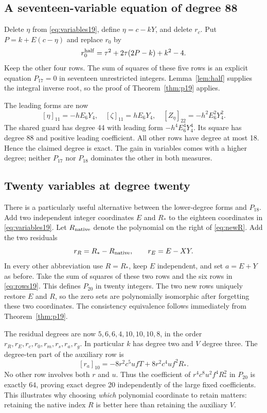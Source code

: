 \documentclass[11pt]{article}
\theoremstyle{remark}\newtheorem{remark}[theorem]{Remark}
\begin{document}
\subsection{A seventeen-variable equation of degree 88}
Delete $\eta$ from \eqref{eq:variables19}, define $\eta=c-kY$, and
delete $r_c$. Put $P=k+E(c-\eta)$ and replace $r_0$ by
\[
 r_0^{\rm half}=\tau^2+2\tau(2P-k)+k^2-4.
\]
Keep the other four rows. The sum of squares of these five rows is an explicit equation
$P_{17}=0$ in seventeen unrestricted integers. Lemma~\ref{lem:half}
supplies the integral inverse root, so the proof of
Theorem~\ref{thm:p19} applies.

The leading forms are now
\[
 [\eta]_{11}=-hE_6Y_4,\quad
 [\zeta]_{11}=hE_6Y_4,\quad
 [Z_\eta]_{22}=-h^2E_6^2Y_4^2.
\]
The shared guard has degree 44 with leading form
$-h^4E_6^4Y_4^4$. Its square has degree 88 and positive leading
coefficient. All other rows have degree at most 18. Hence the claimed
degree is exact. The gain in variables comes with a higher degree;
neither $P_{17}$ nor $P_{18}$ dominates the other in both measures.

\subsection{Twenty variables at degree twenty}
There is a particularly useful alternative between the lower-degree
forms and $P_{18}$. Add two independent integer coordinates $E$ and
$R_*$ to the eighteen coordinates in \eqref{eq:variables19}.
Let $R_{\rm native}$ denote the polynomial on the right of
\eqref{eq:newR}. Add the two residuals
\[
 r_R=R_*-R_{\rm native},\qquad r_E=E-XY.
\]
In every other abbreviation use $R=R_*$, keep $E$ independent, and set
$a=E+Y$ as before. Take the sum of squares of these two rows and the six
rows in \eqref{eq:rows19}. This defines $P_{20}$ in twenty integers.
The two new rows uniquely restore $E$ and $R$, so the zero sets are
polynomially isomorphic after forgetting these two coordinates. The
consistency equivalence follows immediately from Theorem~\ref{thm:p19}.

The residual degrees are now $5,6,6,4,10,10,10,8$, in the order
$r_R,r_E,r_c,r_0,r_m,r_s,r_a,r_g$. In particular $k$ has degree two and
$V$ degree three. The degree-ten part of the auxiliary row is
\[
 [r_a]_{10}=-8r^2c^5ufT+8r^2c^4uf^2R_*.
\]
No other row involves both $r$ and $u$. Thus the coefficient of
$r^4c^8u^2f^4R_*^2$ in $P_{20}$ is exactly $64$, proving exact degree
20 independently of the large fixed coefficients. This illustrates why
choosing \emph{which} polynomial coordinate to retain matters: retaining
the native index $R$ is better here than retaining the auxiliary $V$.
\end{document}
